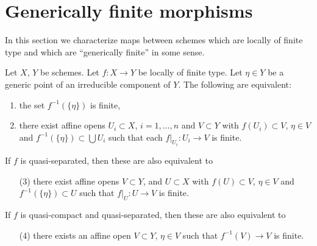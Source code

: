 \section{Generically finite morphisms}
\label{section-generically-finite}

\noindent
In this section we characterize maps between schemes
which are locally of finite type and which are ``generically finite''
in some sense.

\begin{lemma}
\label{lemma-generically-finite}
Let $X$, $Y$ be schemes.
Let $f : X \to Y$ be locally of finite type.
Let $\eta \in Y$ be a generic point of an irreducible component
of $Y$. The following are equivalent:
\begin{enumerate}
\item the set $f^{-1}(\{\eta\})$ is finite,
\item there exist affine opens $U_i \subset X$, $i = 1, \ldots, n$
and $V \subset Y$ with $f(U_i) \subset V$,
$\eta \in V$ and $f^{-1}(\{\eta\}) \subset \bigcup U_i$
such that each $f|_{U_i} : U_i \to V$ is finite.
\end{enumerate}
If $f$ is quasi-separated, then these are also equivalent to
\begin{enumerate}
\item[(3)] there exist affine opens $V \subset Y$,
and $U \subset X$ with $f(U) \subset V$,
$\eta \in V$ and $f^{-1}(\{\eta\}) \subset U$
such that $f|_U : U \to V$ is finite.
\end{enumerate}
If $f$ is quasi-compact and quasi-separated,
then these are also equivalent to
\begin{enumerate}
\item[(4)] there exists an affine open $V \subset Y$, $\eta \in V$
such that $f^{-1}(V) \to V$ is finite.
\end{enumerate}
\end{lemma}

